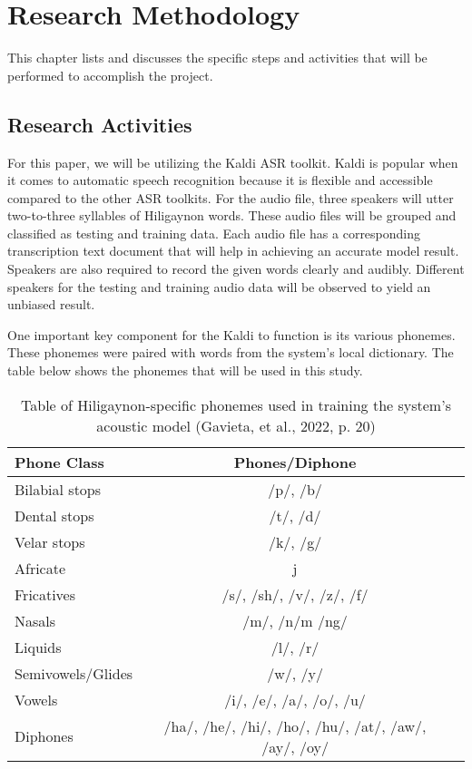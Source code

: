 \chapter{Research Methodology}
This chapter lists and discusses the specific steps and activities that will be performed to accomplish the project.

\section{Research Activities}
For this paper, we will be utilizing the Kaldi ASR toolkit. Kaldi is popular when it comes to automatic speech recognition because it is flexible and accessible compared to the other ASR toolkits. For the audio file, three speakers will utter two-to-three syllables of Hiligaynon words. These audio files will be grouped and classified as testing and training data. Each audio file has a corresponding transcription text document that will help in achieving an accurate model result. Speakers are also required to record the given words clearly and audibly. Different speakers for the testing and training audio data will be observed to yield an unbiased result.

One important key component for the Kaldi to function is its various phonemes. These phonemes were paired with words from the system’s local dictionary. The table below shows the phonemes that will be used in this study.

\begin{table}[h]   %
	\setlength{\extrarowheight}{2pt}
	\setlength{\tabcolsep}{0.2em}
	\centering
	\caption{Table of Hiligaynon-specific phonemes used in training the system's acoustic model (Gavieta, et al., 2022, p. 20)} \vspace{0.25em}
	\begin{tabular}{|p{2in}|c|c|} \hline
		\centering Phone Class & Phones/Diphone \\ \hline
		Bilabial stops & /p/, /b/ \\ \hline
		Dental stops & /t/, /d/ \\ \hline
		Velar stops & /k/, /g/  \\ \hline
		Africate & j \\ \hline
		Fricatives & /s/, /sh/, /v/, /z/, /f/  \\ \hline
		Nasals & /m/, /n/m /ng/  \\ \hline
		Liquids & /l/, /r/ \\ \hline
		Semivowels/Glides & /w/, /y/  \\ \hline
		Vowels & /i/, /e/, /a/, /o/, /u/ \\ \hline
		Diphones & /ha/, /he/, /hi/, /ho/, /hu/, /at/, /aw/, /ay/, /oy/ \\ \hline
		
		
	\end{tabular}
	\label{tab:phoneme-hiligaynon}
\end{table}


